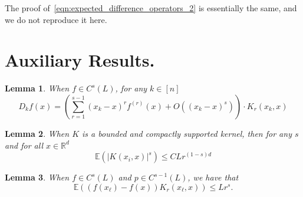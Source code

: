 \documentclass{article}
\newcommand{\Reals}{\mathbb{R}}
\newcommand{\abs}[1]{\left \lvert #1 \right \rvert}
\newcommand{\1}{\mathbf{1}}
\newcommand{\Rd}{\Reals^d}
\newcommand{\Ebb}{\mathbb{E}}
\theoremstyle{alden}
\theoremstyle{aldenthm}
\newtheorem{lemma}{Lemma}
\theoremstyle{definition}
\theoremstyle{remark}
\begin{document}
The proof of~\eqref{eqn:expected_difference_operators_2} is essentially the same, and we do not reproduce it here.
\section{Auxiliary Results.}
\begin{lemma}
	\label{lem:difference_operator_taylor}
	When $f \in C^s(L)$, for any $k \in [n]$ 
	\begin{equation*}
	D_kf(x) = \left(\sum_{r = 1}^{s - 1} (x_k - x)^r f^{(r)}(x) + O((x_k - x)^{s})\right) \cdot K_r(x_k,x)
	\end{equation*}
\end{lemma}

\begin{lemma}
	\label{lem:expected_kernel}
	When $K$ is a bounded and compactly supported kernel, then for any $s$ and for all $x \in \Rd$
	\begin{equation*}
	\Ebb(\abs{K(x_i,x)}^s) \leq CLr^{(1 - s)d}
	\end{equation*}
\end{lemma}

\begin{lemma}
	\label{lem:leading_term}
	When $f \in C^s(L)$ and $p \in C^{s - 1}(L)$, we have that 
	\begin{equation*}
	\Ebb(\left(f(x_{\ell}) - f(x)\right)K_r(x_{\ell},x)) \leq Lr^s.
	\end{equation*}
\end{lemma}
\end{document}
